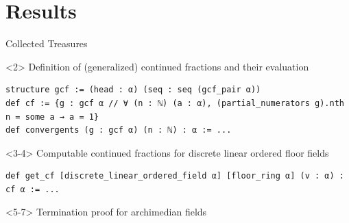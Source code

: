 \documentclass{beamer}
\begin{document}
\section{Results}
\begin{frame}[fragile]{Collected Treasures}
\begin{onlyenv}<2>
Definition of (generalized) continued fractions and their evaluation
\begin{verbatim}
structure gcf := (head : α) (seq : seq (gcf_pair α))
def cf := {g : gcf α // ∀ (n : ℕ) (a : α), (partial_numerators g).nth n = some a → a = 1}
def convergents (g : gcf α) (n : ℕ) : α := ...
\end{verbatim}
\end{onlyenv}
\begin{onlyenv}<3-4>
Computable continued fractions for discrete linear ordered floor fields 
\begin{verbatim}
def get_cf [discrete_linear_ordered_field α] [floor_ring α] (v : α) : cf α := ...
\end{verbatim}
\end{onlyenv}
\begin{onlyenv}<5-7>
Termination proof for archimedian fields
\begin{verbatim}

\end{verbatim}
\end{onlyenv}
\end{frame}
\end{document}
